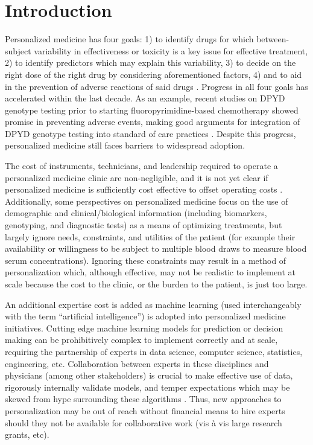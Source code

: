 \section{Introduction}

Personalized medicine has four goals: 1) to identify drugs for which between-subject variability in effectiveness or toxicity is a key issue for effective treatment, 2) to identify predictors which may explain this variability, 3) to decide on the right dose of the right drug by considering aforementioned factors, 4) and to aid in the prevention of adverse reactions of said drugs \cite{morse2015personalized}.  Progress in all four goals has accelerated within the last decade. As an example, recent studies on DPYD genotype testing prior to starting fluoropyrimidine-based chemotherapy showed promise in preventing adverse events, making good arguments for integration of DPYD genotype testing into standard of care practices \cite{wigle2019prospective}. Despite this progress, personalized medicine still faces barriers to widespread adoption.

The cost of instruments, technicians, and leadership required to operate a personalized medicine clinic are non-negligible, and it is not yet clear if personalized medicine is sufficiently cost effective to offset operating costs \cite{kasztura2019cost}. Additionally, some perspectives on personalized medicine focus on the use of demographic and clinical/biological information (including biomarkers, genotyping, and diagnostic tests) as a means of optimizing treatments, but largely ignore needs, constraints, and utilities of the patient \cite{di2017personalized} (for example their availability or willingness to be subject to multiple blood draws to measure blood serum concentrations). Ignoring these constraints may result in a method of personalization which, although effective, may not be realistic to implement at scale because the cost to the clinic, or the burden to the patient, is just too large.

An additional expertise cost is added as machine learning (used interchangeably with the term “artificial intelligence”) is adopted into personalized medicine initiatives.  Cutting edge machine learning models for prediction or decision making can be prohibitively complex to implement correctly and at scale, requiring the partnership of experts in data science, computer science, statistics, engineering, etc.  Collaboration between experts in these disciplines and physicians (among other stakeholders) is crucial to make effective use of data, rigorously internally validate models, and temper expectations which may be skewed from hype surrounding these algorithms \cite{frohlich2018hype}.  Thus, new approaches to personalization may be out of reach without financial means to hire experts should they not be available for collaborative work (vis \`a vis large research grants, etc).  

